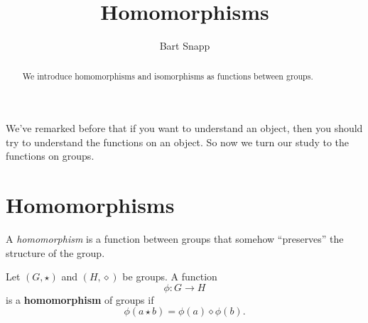 \documentclass{ximera}
\author{Bart Snapp}
\title{Homomorphisms}
\begin{document}
\begin{abstract}
  We introduce homomorphisms and isomorphisms as functions between
  groups.
\end{abstract}
\maketitle

We've remarked before that if you want to understand an object, then
you should try to understand the functions on an object. So now we
turn our study to the functions on groups.


\section{Homomorphisms}


A \textit{homomorphism} is a function between groups that somehow
``preserves'' the structure of the group.


\begin{definition}
  Let $(G,\star)$ and $(H,\diamond)$ be groups. A function
  \[
  \phi:G\to H
  \]
  is a \textbf{homomorphism} of groups if
  \[
  \phi(a\star b) = \phi(a)\diamond\phi(b).
  \]
\end{definition}
\end{document}
